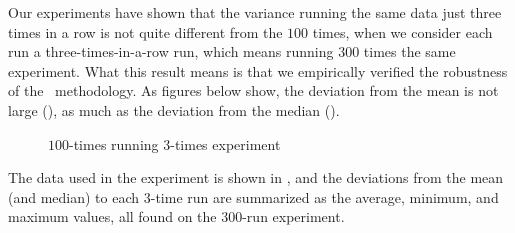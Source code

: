 
Our experiments have shown that the variance running the same data just three times in a row is not quite different from the $100$ times, when we consider each run a three-times-in-a-row run, which means running $300$ times the same experiment. What this result means is that we empirically verified the robustness of the \CP\ methodology. As figures  below show, the deviation from the mean is not large (), as much as the deviation from the median ().

\begin{figure}
  \centering
  
  \begin{minipage}[t]{\linewidth}
  \end{minipage}
  \caption{$100$-times running $3$-times experiment}
  \label{fig:CProbust}
\end{figure}

The data used in the experiment is shown in , and the deviations from the mean (and median) to each $3$-time run are summarized as the average, minimum, and maximum values, all found on the $300$-run experiment.

